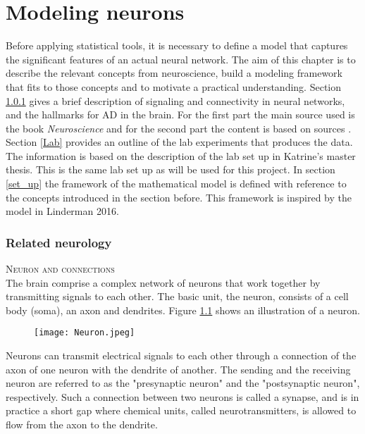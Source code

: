 
\chapter{Modeling neurons}

Before applying statistical tools, it is necessary to define a model that captures the significant features of an actual neural network. The aim of this chapter is to describe the relevant concepts from neuroscience, build a modeling framework that fits to those concepts and to motivate a practical understanding. Section \ref{structure_nn} gives a brief description of signaling and connectivity in neural networks, and the hallmarks for AD in the brain. For the first part the main source used is the book \textit{Neuroscience} \cite{Purves} and for the second part the content is based on sources \cite{Gomez,Witter:2011}. Section \ref{Lab} provides an outline of the lab experiments that produces the data. The information is based on the description of the lab set up in Katrine's master thesis. This is the same lab set up as will be used for this project. In section \ref{set_up} the  framework of the mathematical model is defined with reference to the concepts introduced in the section before. This framework is inspired by the model in Linderman 2016.  



\subsection{Related neurology}
\label{structure_nn}

\textsc{Neuron and connections}\\
The brain comprise a complex network of neurons that work together by transmitting signals to each other. The basic unit, the neuron, 
 consists of a cell body (soma), an axon and dendrites. Figure \ref{neuron} shows an illustration of a neuron.
\begin{figure}[h]
    \caption{}
    \label{neuron}
    \centering
    \texttt{[image: Neuron.jpeg]}
\end{figure} 

Neurons can transmit electrical signals to each other through a connection of the axon of one neuron with the dendrite of another. The sending and the receiving neuron are referred to as the "presynaptic neuron" and the "postsynaptic neuron", respectively. Such a connection between two neurons is called a synapse, and is in practice a short gap where chemical units, called neurotransmitters, is allowed to flow from the axon to the dendrite. 

